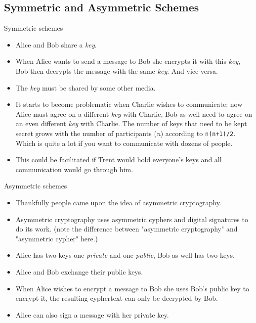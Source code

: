 \documentclass[hyperref={colorlinks=true}]{beamer}
\begin{document}
\subsection{Symmetric and Asymmetric Schemes}
\begin{frame}{Symmetric schemes}
  \begin{itemize}
    \item Alice and Bob share a \emph{key}.
    \item When Alice wants to send a message to Bob she encrypts it with this
\emph{key}, Bob then decrypts the message with the same \emph{key}.  And
vice-versa.
    \item The \emph{key} must be shared by some other media.
    \item It starts to become problematic when Charlie wishes to communicate:
now Alice must agree on a different \emph{key} with Charlie, Bob as well need
to agree on an even different \emph{key} with Charlie.  The number of keys that
need to be kept secret grows with the number of participants (\emph{n})
according to \texttt{n(n+1)/2}.  Which is quite a lot if you want to
communicate with dozens of people.
    \item This could be facilitated if Trent would hold everyone's keys and all
communication would go through him.
  \end{itemize}
\end{frame}

\begin{frame}{Asymmetric schemes}
  \begin{itemize}
    \item Thankfully people came upon the idea of asymmetric cryptography.
    \item Asymmetric cryptography uses asymmetric cyphers and digital
signatures to do its work.  (note the difference between "asymmetric
cryptography" and "asymmetric cypher" here.)
    \item Alice has two keys one \emph{private} and one \emph{public}, Bob as
well has two keys.
    \item Alice and Bob exchange their public keys.
    \item When Alice wishes to encrypt a message to Bob she uses Bob's public
key to encrypt it, the resulting cyphertext can only be decrypted by Bob.
    \item Alice can also sign a message with her private key.
  \end{itemize}
\end{frame}
\end{document}
